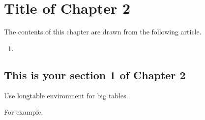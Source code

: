 \chapter{Title of Chapter 2}

The contents of this chapter are drawn from the following article.

\begin{enumerate}
	\item {}
\end{enumerate}

\blindtext

\blindtext
\section{This is your section 1 of Chapter 2}

Use longtable environment for big tables..

For example,


